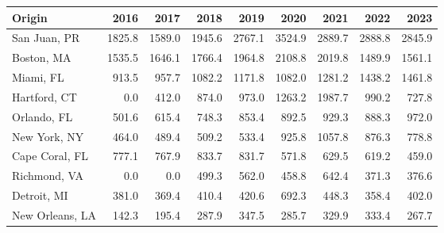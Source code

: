 
\begin{tabular}[t]{lrrrrrrrr}
\toprule
Origin & 2016 & 2017 & 2018 & 2019 & 2020 & 2021 & 2022 & 2023\\
\midrule
San Juan, PR & 1825.8 & 1589.0 & 1945.6 & 2767.1 & 3524.9 & 2889.7 & 2888.8 & 2845.9\\
Boston, MA & 1535.5 & 1646.1 & 1766.4 & 1964.8 & 2108.8 & 2019.8 & 1489.9 & 1561.1\\
Miami, FL & 913.5 & 957.7 & 1082.2 & 1171.8 & 1082.0 & 1281.2 & 1438.2 & 1461.8\\
Hartford, CT & 0.0 & 412.0 & 874.0 & 973.0 & 1263.2 & 1987.7 & 990.2 & 727.8\\
Orlando, FL & 501.6 & 615.4 & 748.3 & 853.4 & 892.5 & 929.3 & 888.3 & 972.0\\
\addlinespace
New York, NY & 464.0 & 489.4 & 509.2 & 533.4 & 925.8 & 1057.8 & 876.3 & 778.8\\
Cape Coral, FL & 777.1 & 767.9 & 833.7 & 831.7 & 571.8 & 629.5 & 619.2 & 459.0\\
Richmond, VA & 0.0 & 0.0 & 499.3 & 562.0 & 458.8 & 642.4 & 371.3 & 376.6\\
Detroit, MI & 381.0 & 369.4 & 410.4 & 420.6 & 692.3 & 448.3 & 358.4 & 402.0\\
New Orleans, LA & 142.3 & 195.4 & 287.9 & 347.5 & 285.7 & 329.9 & 333.4 & 267.7\\
\bottomrule
\end{tabular}
